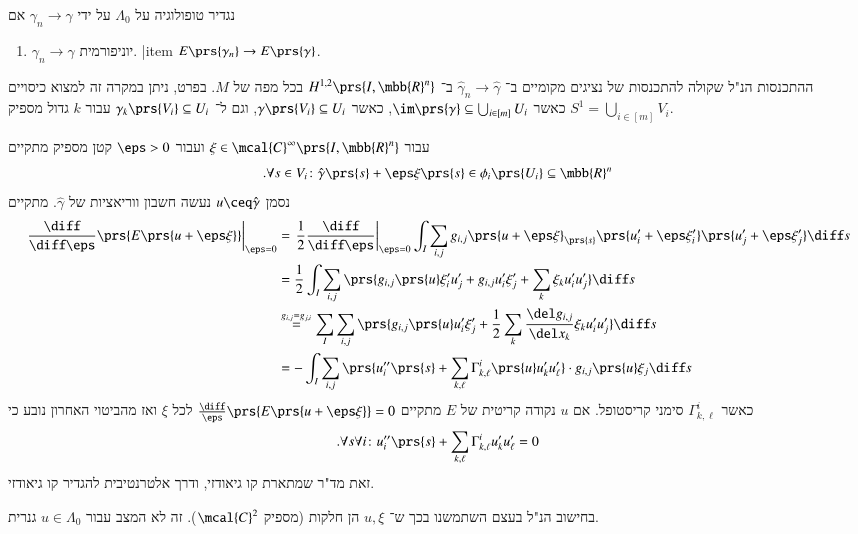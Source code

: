 \documentclass[a4paper,10pt,twoside,openany]{book}
\begin{document}
\begin{definition}
נגדיר טופולוגיה על
$\Lambda_0$
על ידי
$\gamma_n \to \gamma$
אם
\begin{enumerate}
\item $\gamma_n \to \gamma$
יוניפורמית.
|item $E\prs{\gamma_n} \to E\prs{\gamma}$.
\end{enumerate}
\end{definition}

\begin{remark}
ההתכנסות הנ"ל שקולה להתכנסות של נציגים מקומיים ב־%
$\hat{\gamma}_n \to \hat{\gamma}$
ב־%
$H^{1,2}\prs{I, \mbb{R}^n}$
בכל מפה של
$M$.
בפרט, ניתן במקרה זה למצוא כיסויים
$S^1 = \bigcup_{i \in [m]} V_i$
כאשר
$\im\prs{\gamma} \subseteq \bigcup_{i \in [m]} U_i$,
כאשר
$\gamma\prs{V_i} \subseteq U_i$,
וגם ל־%
$\gamma_k\prs{V_i} \subseteq U_i$
עבור
$k$
גדול מספיק.

עבור
$\xi \in \mcal{C}^\infty\prs{I, \mbb{R}^n}$
ועבור
$\eps > 0$
קטן מספיק
מתקיים
\[\text{.} \forall s \in V_i \colon \hat{\gamma}\prs{s} + \eps \xi\prs{s} \in \phi_i\prs{U_i} \subseteq \mbb{R}^n\]
נסמן
$u \ceq \hat{\gamma}$
נעשה חשבון ווריאציות של
$\hat{\gamma}$.
מתקיים
\begin{align*}
\left. \frac{\diff}{\diff \eps} \prs{E \prs{u + \eps \xi}} \right|_{\eps = 0} &= \left. \frac{1}{2} \frac{\diff}{\diff \eps} \right|_{\eps = 0} \int_I \sum_{i,j} g_{i,j} \prs{u + \eps \xi}_{\prs{s}} \prs{u_i' + \eps \xi_i'} \prs{u_j' + \eps \xi_j'} \diff s
\\&=
\frac{1}{2} \int_I \sum_{i,j} \prs{g_{i,j}\prs{u} \xi'_i u'_j + g_{i,j} u'_i \xi_j' + \sum_k \xi_k u_i' u_j'} \diff s
\\&\stackrel{g_{i,j} = g_{j,i}}{=}
\sum_I \sum_{i,j} \prs{ g_{i,j} \prs{u} u_i' \xi_j' + \frac{1}{2} \sum_k \frac{\del g_{i,j}}{\del x_k} \xi_k u_i' u_j'} \diff s
\\&=
-\int_I \sum_{i,j} \prs{u_i''\prs{s} + \sum_{k,\ell} \Gamma^i_{k,\ell} \prs{u} u_k' u_\ell'} \cdot g_{i,j} \prs{u} \xi_j \diff s
\end{align*}
כאשר
$\Gamma^i_{k,\ell}$
סימני קריסטופל.
אם
$u$
נקודה קריטית של
$E$
מתקיים
$\frac{\diff}{\eps} \prs{E \prs{u + \eps \xi}} = 0$
לכל
$\xi$
ואז מהביטוי האחרון נובע כי
\begin{align*}
\text{.} \forall s \forall i \colon u''_i \prs{s} + \sum_{k,\ell} \Gamma^i_{k,\ell} u'_k u_\ell' = 0
\end{align*}
זאת מד"ר שמתארת קו גיאודזי, ודרך אלטרנטיבית להגדיר קו גיאודזי.

בחישוב הנ"ל בעצם השתמשנו בכך ש־%
$u, \xi$
הן חלקות (מספיק
$\mcal{C}^2$).
זה לא המצב עבור
$u \in \Lambda_0$
גנרית.
\end{remark}
\end{document}
